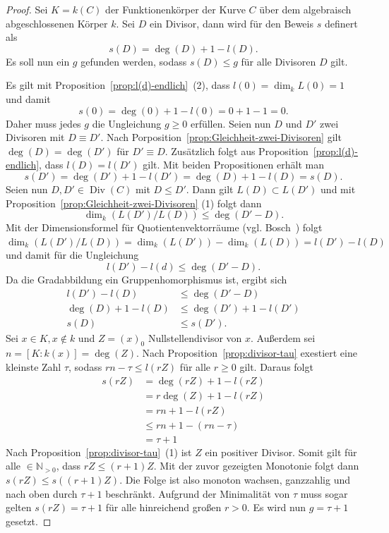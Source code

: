 \begin{proof}
  Sei $K=k(C)$ der Funktionenkörper der Kurve $C$ über dem algebraisch abgeschlossenen Körper $k$. Sei $D$ ein Divisor, dann wird für den Beweis $s$ definert als
  \[
    s(D)=\deg(D)+1-l(D).
  \]
  Es soll nun ein $g$ gefunden werden, sodass $s(D)\leq g$ für alle Divisoren $D$ gilt.

  Es gilt mit Proposition~\ref{prop:l(d)-endlich}~(2), dass $l(0)=\dim_k L(0)=1$ und damit
  \[
    s(0)=\deg(0)+1-l(0)=0+1-1=0.
  \]
  Daher muss jedes $g$ die Ungleichung $g\geq 0$ erfüllen. Seien nun $D$ und $D'$ zwei Divisoren mit $D\equiv D'$. Nach Porposition~\ref{prop:Gleichheit-zwei-Divisoren} gilt $\deg(D)=\deg(D')$ für $D'\equiv D$. Zusätzlich folgt aus Proposition~\ref{prop:l(d)-endlich}, dass $l(D)=l(D')$ gilt. Mit beiden Propositionen erhält man
  \[
    s(D')=\deg(D')+1-l(D')=\deg(D)+1-l(D)=s(D).
  \]
  Seien nun $D,D'\in\operatorname{Div}(C)$ mit $D\leq D'$. Dann gilt $L(D)\subset L(D')$ und mit Proposition~\ref{prop:Gleichheit-zwei-Divisoren} (1) folgt dann
  \[
    \dim_k(L(D')/L(D))\leq\deg(D'-D).
  \]
  Mit der Dimensionsformel für Quotientenvektorräume (vgl. Bosch~\cite[S.69]{Bosch06}) folgt
  \( \dim_k(L(D')/L(D)) = \dim_k(L(D')) - \dim_k(L(D)) = l(D') - l(D)\) und damit für die Ungleichung
  \[
    l(D')-l(d)\leq \deg(D'-D).
  \]
  Da die Gradabbildung ein Gruppenhomorphismus ist, ergibt sich
  \begin{align*}
    l(D')-l(D)     & \leq \deg(D'-D)       \\
    \deg(D)+1-l(D) & \leq \deg(D')+1-l(D') \\
    s(D)           & \leq s(D').
  \end{align*}
  Sei $x\in K,x\notin k$ und $Z=(x)_0$  Nullstellendivisor von $x$. Außerdem sei $n=[K:k(x)]=\deg(Z)$. Nach Proposition~\ref{prop:divisor-tau} exestiert eine kleinste Zahl $\tau$, sodass \(rn-\tau\leq l(rZ)\) für alle $r\geq 0$ gilt. Daraus folgt
  \begin{align*}
    s(rZ) & = \deg(rZ)+1-l(rZ)  \\
          & = r\deg(Z)+1-l(rZ)  \\
          & = rn+1-l(rZ)        \\
          & \leq rn+1-(rn-\tau) \\
          & = \tau + 1
  \end{align*}
  Nach Proposition~\ref{prop:divisor-tau}~(1) ist $Z$ ein positiver Divisor. Somit gilt für alle $\in\mathbb{N}_{>0}$, dass $rZ\leq(r+1)Z$. Mit der zuvor gezeigten Monotonie folgt dann \(s(rZ)\leq s((r+1)Z)\). Die Folge ist also monoton wachsen, ganzzahlig und nach oben durch $\tau+1$ beschränkt. Aufgrund der Minimalität von $\tau$ muss sogar gelten $s(rZ)=\tau+1$ für alle hinreichend großen $r>0$. Es wird nun $g=\tau+1$ gesetzt.


\end{proof}
